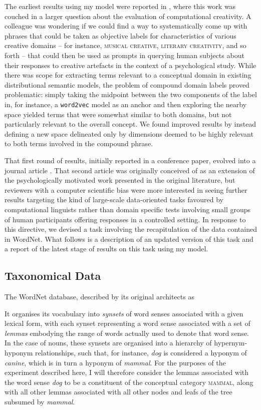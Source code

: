 The earliest results using my model were reported in \cite{AgresEA2015}, where this work was couched in a larger question about the evaluation of computational creativity.  A colleague was wondering if we could find a way to systematically come up with phrases that could be taken as objective labels for characteristics of various creative domains -- for instance, \textsc{musical creative}, \textsc{literary creativity}, and so forth -- that could then be used as prompts in querying human subjects about their responses to creative artefacts in the context of a psychological study.  While there was scope for extracting terms relevant to a conceptual domain in existing distributional semantic models, the problem of compound domain labels proved problematic: simply taking the midpoint between the two components of the label in, for instance, a \texttt{word2vec} model as an anchor and then exploring the nearby space yielded terms that were somewhat similar to both domains, but not particularly relevant to the overall concept.  We found improved results by instead defining a new space delineated only by dimensions deemed to be highly relevant to both terms involved in the compound phrase.

That first round of results, initially reported in a conference paper, evolved into a journal article \citep{McGregorEA2015c}.  That second article was originally conceived of as an extension of the psychologically motivated work presented in the original literature, but reviewers with a computer scientific bias were more interested in seeing further results targeting the kind of large-scale data-oriented tasks favoured by computational linguists rather than domain specific tests involving small groups of human participants offering responses in a controlled setting.  In response to this directive, we devised a task involving the recapitulation of the data contained in WordNet.  What follows is a description of an updated version of this task and a report of the latest stage of results on this task using my model.

\subsection{Taxonomical Data}
The WordNet database, described by its original architects as 

It organises its vocabulary into \emph{synsets} of word senses associated with a given lexical form, with each synset representing a word sense associated with a set of \emph{lemmas} embodying the range of words actually used to denote that word sense.  In the case of nouns, these synsets are organised into a hierarchy of hypernym-hyponym relationships, such that, for instance, \emph{dog} is considered a hyponym of \emph{canine}, which is in turn a hyponym of \emph{mammal}.  For the purposes of the experiment described here, I will therefore consider the lemmas associated with the word sense \emph{dog} to be a constituent of the conceptual category \textsc{mammal}, along with all other lemmas associated with all other nodes and leafs of the tree subsumed by \emph{mammal}.

